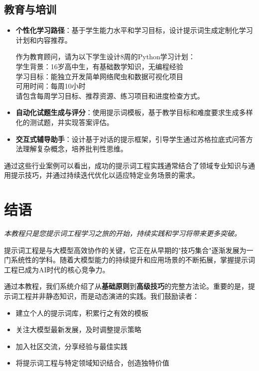 \documentclass[12pt]{ctexart}
\newcommand{\chapternote}[1]{\vspace{-0.3cm}\par\noindent\textit{\small #1}\vspace{0.3cm}}
\begin{document}
\subsection{教育与培训}

\begin{itemize}
  \item \textbf{个性化学习路径}：基于学生能力水平和学习目标，设计提示词生成定制化学习计划和内容推荐。
  
  \begin{promptbox}
  作为教育顾问，请为以下学生设计8周的Python学习计划：\\
  学生背景：16岁高中生，有基础数学知识，无编程经验\\
  学习目标：能独立开发简单网络爬虫和数据可视化项目\\
  可用时间：每周10小时\\
  请包含每周学习目标、推荐资源、练习项目和进度检查方式。
  \end{promptbox}
  
  \item \textbf{自动化试题生成与评分}：使用提示词模板，基于教学目标和难度要求生成多样化的测试题，并实现答案评估。
  
  \item \textbf{交互式辅导助手}：设计基于对话的提示框架，引导学生通过苏格拉底式问答方法理解复杂概念，培养批判性思维。
\end{itemize}

通过这些行业案例可以看出，成功的提示词工程实践通常结合了领域专业知识与通用提示技巧，并通过持续迭代优化以适应特定业务场景的需求。

\section{结语}
\chapternote{本教程只是您提示词工程学习之旅的开始，持续实践和学习将带来更多突破。}

提示词工程是与大模型高效协作的关键，它正在从早期的"技巧集合"逐渐发展为一门系统性的学科。随着大模型能力的持续提升和应用场景的不断拓展，掌握提示词工程已成为AI时代的核心竞争力。

通过本教程，我们系统介绍了从\textbf{基础原则}到\textbf{高级技巧}的完整方法论。重要的是，提示词工程并非静态知识，而是动态演进的实践。我们鼓励读者：

\begin{itemize}
  \item 建立个人的提示词库，积累行之有效的模板
  \item 关注大模型最新发展，及时调整提示策略
  \item 加入社区交流，分享经验与最佳实践
  \item 将提示词工程与特定领域知识结合，创造独特价值
\end{itemize}
\end{document}
